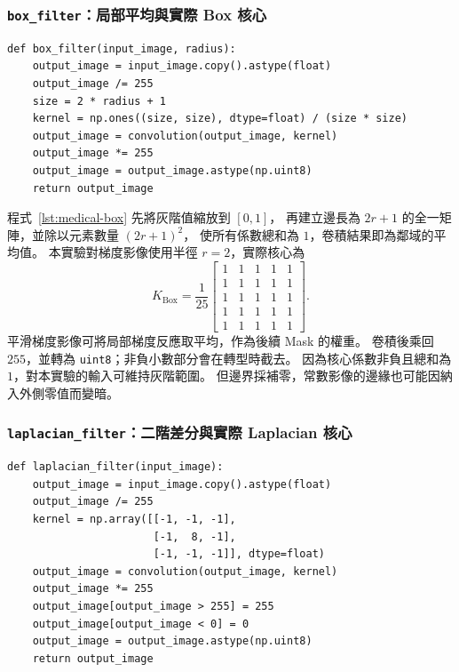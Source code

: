 \subsubsection{\textnormal{\texttt{box\_filter}}：局部平均與實際 Box 核心}

\noindent\begin{minipage}{\linewidth}
\begin{lstlisting}[caption={依半徑建立正規化 Box 核心並平滑影像},label={lst:medical-box}]
def box_filter(input_image, radius):
    output_image = input_image.copy().astype(float)
    output_image /= 255
    size = 2 * radius + 1
    kernel = np.ones((size, size), dtype=float) / (size * size)
    output_image = convolution(output_image, kernel)
    output_image *= 255
    output_image = output_image.astype(np.uint8)
    return output_image
\end{lstlisting}
\end{minipage}\par

程式~\ref{lst:medical-box} 先將灰階值縮放到 $[0,1]$，
再建立邊長為 $2r+1$ 的全一矩陣，並除以元素數量 $(2r+1)^2$，
使所有係數總和為 $1$，卷積結果即為鄰域的平均值。
本實驗對梯度影像使用半徑 $r=2$，實際核心為
\begin{equation}
  K_{\mathrm{Box}}=\frac{1}{25}
  \begin{bmatrix}
    1&1&1&1&1\\
    1&1&1&1&1\\
    1&1&1&1&1\\
    1&1&1&1&1\\
    1&1&1&1&1
  \end{bmatrix}.
  \label{eq:medical-box-kernel}
\end{equation}
平滑梯度影像可將局部梯度反應取平均，作為後續 Mask 的權重。
卷積後乘回 $255$，並轉為 \texttt{uint8}；非負小數部分會在轉型時截去。
因為核心係數非負且總和為 $1$，對本實驗的輸入可維持灰階範圍。
但邊界採補零，常數影像的邊緣也可能因納入外側零值而變暗。

\subsubsection{\textnormal{\texttt{laplacian\_filter}}：二階差分與實際 Laplacian 核心}

\noindent\begin{minipage}{\linewidth}
\begin{lstlisting}[caption={使用中心為正的八鄰居 Laplacian 核心},label={lst:medical-laplacian}]
def laplacian_filter(input_image):
    output_image = input_image.copy().astype(float)
    output_image /= 255
    kernel = np.array([[-1, -1, -1],
                       [-1,  8, -1],
                       [-1, -1, -1]], dtype=float)
    output_image = convolution(output_image, kernel)
    output_image *= 255
    output_image[output_image > 255] = 255
    output_image[output_image < 0] = 0
    output_image = output_image.astype(np.uint8)
    return output_image
\end{lstlisting}
\end{minipage}\par

